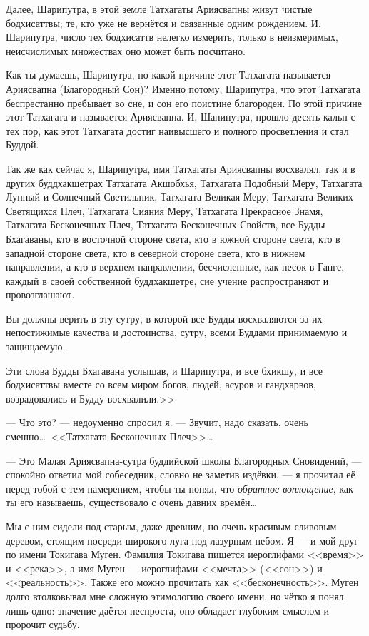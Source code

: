 \documentclass[openany, oneside]{book}
\begin{document}
Далее, Шарипутра, в этой земле Татхагаты Ариясвапны живут чистые бодхисаттвы; те, кто уже не вернётся и связанные одним рождением. И, Шарипутра, число тех бодхисаттв нелегко измерить, только в неизмеримых, неисчислимых множествах оно может быть посчитано.

Как ты думаешь, Шарипутра, по какой причине этот Татхагата называется Ариясвапна (Благородный Сон)? Именно потому, Шарипутра, что этот Татхагата беспрестанно пребывает во сне, и сон его поистине благороден. По этой причине этот Татхагата и называется Ариясвапна. И, Шапипутра, прошло десять кальп с тех пор, как этот Татхагата достиг наивысшего и полного просветления и стал Буддой.

Так же как сейчас я, Шарипутра, имя Татхагаты Ариясвапны восхвалял, так и в других буддхакшетрах Татхагата Акшобхья, Татхагата Подобный Меру, Татхагата Лунный и Солнечный Светильник, Татхагата Великая Меру, Татхагата Великих Светящихся Плеч, Татхагата Сияния Меру, Татхагата Прекрасное Знамя, Татхагата Бесконечных Плеч, Татхагата Бесконечных Свойств, все Будды Бхагаваны, кто в восточной стороне света, кто в южной стороне света, кто в западной стороне света, кто в северной стороне света, кто в нижнем направлении, а кто в верхнем направлении, бесчисленные, как песок в Ганге, каждый в своей собственной буддхакшетре, сие учение распространяют и провозглашают.

Вы должны верить в эту сутру, в которой все Будды восхваляются за их непостижимые качества и достоинства, сутру, всеми Буддами принимаемую и защищаемую.

Эти слова Будды Бхагавана услышав, и Шарипутра, и все бхикшу, и все бодхисаттвы вместе со всем миром богов, людей, асуров и гандхарвов, возрадовались и Будду восхвалили.>>

--- Что это? --- недоуменно спросил я. --- Звучит, надо сказать, очень смешно\dots \ <<Татхагата Бесконечных Плеч>>\dots

--- Это Малая Ариясвапна-сутра буддийской школы Благородных Сновидений, --- спокойно ответил мой собеседник, словно не заметив издёвки, --- я прочитал её перед тобой с тем намерением, чтобы ты понял, что \textit{обратное воплощение}, как ты его называешь, существовало с очень давних времён\dots

Мы с ним сидели под старым, даже древним, но очень красивым сливовым деревом, стоящим посреди широкого луга под лазурным небом. Я --- и мой друг по имени Токигава Муген. Фамилия Токигава пишется иероглифами <<время>> и <<река>>, а имя Муген --- иероглифами <<мечта>> (<<сон>>) и <<реальность>>. Также его можно прочитать как <<бесконечность>>. Муген долго втолковывал мне сложную этимологию своего имени, но чётко я понял лишь одно: значение даётся неспроста, оно обладает глубоким смыслом и пророчит судьбу.\\
\end{document}
